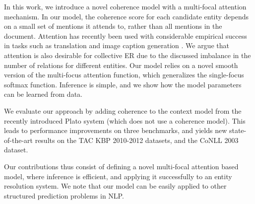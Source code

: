 In this work, we introduce a novel coherence model with a multi-focal attention mechanism. In our model, the coherence score for each candidate entity depends on a small set of mentions it attends to, rather than all mentions in the document. Attention has recently been used with considerable empirical success in tasks such as translation \cite{bahdanau2014neural} and image caption generation \cite{xu2015show}. We argue that attention is also desirable for collective ER due to the discussed imbalance in the number of relations for different entities.
Our model relies on a novel smooth version of the multi-focus attention function, which generalizes the single-focus softmax function. Inference is simple, and we show how the model parameters can be learned from data.


We evaluate our approach by adding coherence to the context model from the recently introduced Plato system \cite{Lazic2015} (which does not use a coherence model). This leads to performance improvements on three benchmarks, and yields new state-of-the-art results on the TAC KBP 2010-2012 datasets, and the CoNLL 2003 dataset.

Our contributions thus consist of defining a novel multi-focal attention based model, where inference is efficient, and applying it successfully to an entity resolution system. We note that our model can be easily applied to other structured prediction problems in NLP.

